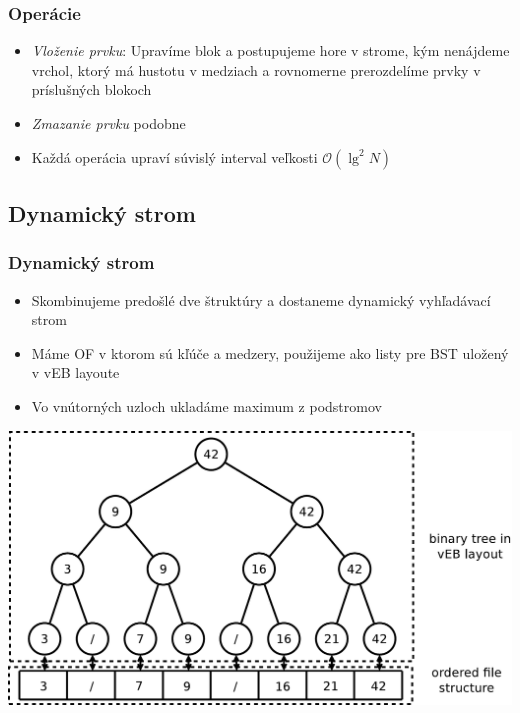 \documentclass{beamer}
\newcommand{\bigO}{\ensuremath{\mathcal{O}}}
\begin{document}
\begin{frame}
    \frametitle{Operácie}
    \begin{itemize}
        \item {\em Vloženie prvku}: Upravíme blok a postupujeme hore v strome, kým nenájdeme vrchol, ktorý má hustotu v medziach a rovnomerne prerozdelíme prvky v príslušných blokoch
        \item {\em Zmazanie prvku} podobne
        \item Každá operácia upraví súvislý interval veľkosti $\bigO(\lg^2 N)$
    \end{itemize}
\end{frame}

\subsection{Dynamický strom}
\begin{frame}
    \frametitle{Dynamický strom}
    \begin{itemize}
        \item Skombinujeme predošlé dve štruktúry a dostaneme dynamický vyhľadávací strom
        \item Máme OF v ktorom sú kľúče a medzery, použijeme ako listy pre BST uložený v vEB layoute
        \item Vo vnútorných uzloch ukladáme maximum z podstromov
    \end{itemize}
    \begin{center}
        \includegraphics[height=0.5\textheight]{../figures/downloaded_dont_use/vEBpOFM.pdf}
    \end{center}
\end{frame}
\end{document}
